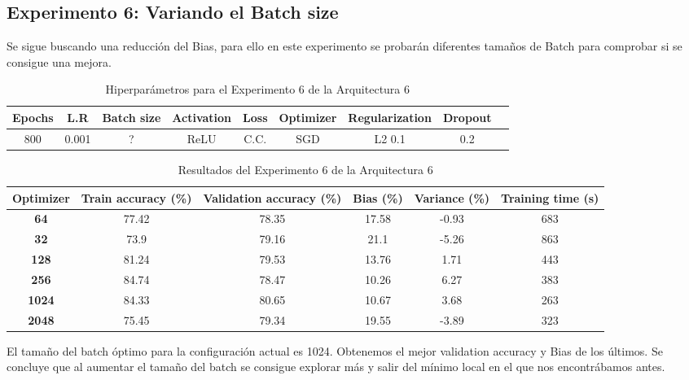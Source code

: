 \documentclass{article}
\begin{document}
   \subsection{Experimento 6: Variando el Batch size}

Se sigue buscando una reducci\'on del Bias, para ello en este experimento se probar\'an diferentes tama\~{n}os de Batch para comprobar si se consigue una mejora. 

    \begin{table}[!h]
				\begin{tabular}{|c|c|c|c|c|c|c|c|c|}
					\textbf{Epochs}&\textbf{L.R}&\textbf{Batch size}&\textbf{Activation}&\textbf{Loss}&\textbf{Optimizer}&\textbf{Regularization}&\textbf{Dropout}   \\ \hline
					800 & 0.001 & ?& ReLU & C.C. & SGD & L2 0.1 & 0.2 
				\end{tabular}
				\caption{Hiperpar\'ametros para el Experimento 6 de la Arquitectura 6}
				\label{tab:hip-a6-e2}
			\end{table}

    
   
   \begin{table}[!h]
				\begin{center}
					\begin{tabular}{ c | c | c | c | c | c |}
						 \textbf{Optimizer} & \textbf{Train accuracy (\%)} & \textbf{Validation accuracy (\%)} & \textbf{Bias (\%)} & \textbf{Variance (\%)} & \textbf{Training time (s)} \\ \hline
	
                        \textbf{64} &  77.42   &  78.35& 17.58 & -0.93 &   683  \\ \hline
                        \textbf{32} &  73.9    & 79.16& 21.1 & -5.26 &   863  \\ \hline
                        \textbf{128} &  81.24  &  79.53& 13.76 &  1.71  &   443   \\ \hline
                        \textbf{256} &  84.74 &  78.47 & 10.26 & 6.27 &   383    \\ \hline
                        \textbf{1024} & 84.33 &  80.65 & 10.67 & 3.68 &   263     \\ \hline
                        \textbf{2048} & 75.45 &  79.34 & 19.55  & -3.89 &   323      \\ \hline
					\end{tabular}
					\caption{Resultados del Experimento 6 de la Arquitectura 6}
					\label{tab:res-a2-e5}
				\end{center}
			\end{table}
   El tama\~{n}o del batch \'optimo para la configuraci\'on actual es 1024. Obtenemos el mejor validation accuracy y Bias de los \'ultimos. Se concluye que al aumentar el tama\~{n}o del batch se consigue explorar m\'as y salir del m\'inimo local en el que nos encontr\'abamos antes. 
\end{document}
